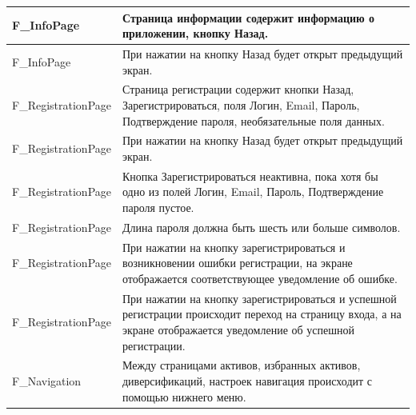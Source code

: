 \documentclass[a4paper, 14pt]{article}
\begin{document}
\begin{longtable}{| p{} | p{} |}
    F\_InfoPage                  & Страница информации содержит информацию о приложении, кнопку Назад.                                                                                                 \\ \hline
    F\_InfoPage                  & При нажатии на кнопку Назад будет открыт предыдущий экран.                                                                                                          \\ \hline

    F\_RegistrationPage          & Страница регистрации содержит кнопки Назад, Зарегистрироваться, поля Логин, Email, Пароль, Подтверждение пароля, необязательные поля данных.                        \\ \hline %
    F\_RegistrationPage          & При нажатии на кнопку Назад будет открыт предыдущий экран.                                                                                                          \\ \hline
    F\_RegistrationPage          & Кнопка Зарегистрироваться неактивна, пока хотя бы одно из полей Логин, Email, Пароль, Подтверждение пароля пустое.                                                  \\ \hline
    F\_RegistrationPage          & Длина пароля должна быть шесть или больше символов.                                                                                                                 \\ \hline
    F\_RegistrationPage          & При нажатии на кнопку зарегистрироваться и возникновении ошибки регистрации, на экране отображается соответствующее уведомление об ошибке.                          \\ \hline
    F\_RegistrationPage          & При нажатии на кнопку зарегистрироваться и успешной регистрации происходит переход на страницу входа, а на экране отображается уведомление об успешной регистрации. \\ \hline

    F\_Navigation                & Между страницами активов, избранных активов, диверсификаций, настроек навигация происходит с помощью нижнего меню.                                                  \\ \hline


\end{longtable}
\end{document}
